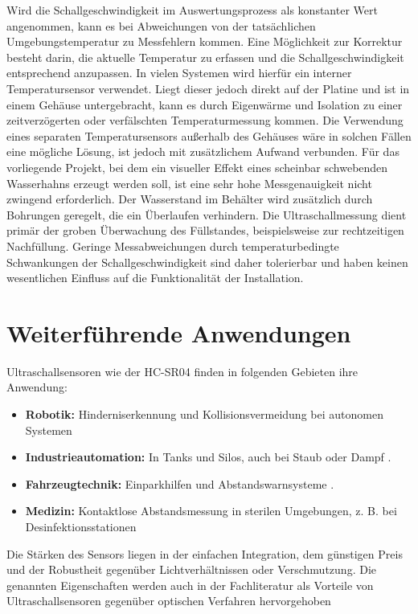Wird die Schallgeschwindigkeit im Auswertungsprozess als konstanter Wert angenommen, kann es bei Abweichungen von der tatsächlichen Umgebungstemperatur zu Messfehlern kommen. Eine Möglichkeit zur Korrektur besteht darin, die aktuelle Temperatur zu erfassen und die Schallgeschwindigkeit entsprechend anzupassen.
In vielen Systemen wird hierfür ein interner Temperatursensor verwendet. Liegt dieser jedoch direkt auf der Platine und ist in einem Gehäuse untergebracht, kann es durch Eigenwärme und Isolation zu einer zeitverzögerten oder verfälschten Temperaturmessung kommen. Die Verwendung eines separaten Temperatursensors außerhalb des Gehäuses wäre in solchen Fällen eine mögliche Lösung, ist jedoch mit zusätzlichem Aufwand verbunden.
Für das vorliegende Projekt, bei dem ein visueller Effekt eines scheinbar schwebenden Wasserhahns erzeugt werden soll, ist eine sehr hohe Messgenauigkeit nicht zwingend erforderlich. Der Wasserstand im Behälter wird zusätzlich durch Bohrungen geregelt, die ein Überlaufen verhindern. Die Ultraschallmessung dient primär der groben Überwachung des Füllstandes, beispielsweise zur rechtzeitigen Nachfüllung. Geringe Messabweichungen durch temperaturbedingte Schwankungen der Schallgeschwindigkeit sind daher tolerierbar und haben keinen wesentlichen Einfluss auf die Funktionalität der Installation.


\section{Weiterführende Anwendungen}
Ultraschallsensoren wie der HC-SR04 finden in folgenden Gebieten ihre Anwendung:
\begin{itemize}
	\item \textbf{Robotik:} Hinderniserkennung und Kollisionsvermeidung bei autonomen Systemen
	\cite{Traenkler:2014}
	\item \textbf{Industrieautomation:} In Tanks und Silos, auch bei Staub oder Dampf \cite{Hering:2023}.
	\item \textbf{Fahrzeugtechnik:} Einparkhilfen und Abstandswarnsysteme \cite{Hering:2023}.
	\item \textbf{Medizin:} Kontaktlose Abstandsmessung in sterilen Umgebungen, z. B. bei
	Desinfektionsstationen \cite{Hering:2023}
\end{itemize}
Die Stärken des Sensors liegen in der einfachen Integration, dem günstigen Preis und der
Robustheit gegenüber Lichtverhältnissen oder Verschmutzung.
Die genannten Eigenschaften werden auch in der Fachliteratur als Vorteile von
Ultraschallsensoren gegenüber optischen Verfahren hervorgehoben \cite{Hering:2023}

